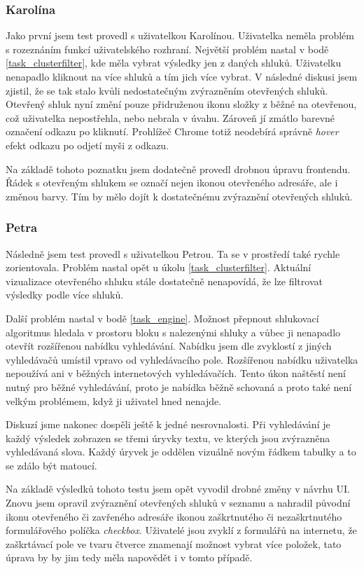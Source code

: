 \subsubsection{Karolína}
Jako první jsem test provedl s uživatelkou Karolínou. Uživatelka neměla problém s rozeznáním funkcí uživatelského rozhraní. Největší problém nastal v bodě \ref{task_clusterfilter}, kde měla vybrat výsledky jen z daných shluků. Uživatelku nenapadlo kliknout na více shluků a tím jich více vybrat. V následné diskusi jsem zjistil, že se tak stalo kvůli nedostatečným zvýrazněním otevřených shluků. Otevřený shluk nyní změní pouze přidruženou ikonu složky z běžné na otevřenou, což uživatelka nepostřehla, nebo nebrala v úvahu. Zároveň jí zmátlo barevné označení odkazu po kliknutí. Prohlížeč Chrome totiž neodebírá správně \emph{hover} efekt odkazu po odjetí myši z odkazu.

Na základě tohoto poznatku jsem dodatečně provedl drobnou úpravu frontendu. Řádek s otevřeným shlukem se označí nejen ikonou otevřeného adresáře, ale i změnou barvy. Tím by mělo dojít k dostatečnému zvýraznění otevřených shluků.

\subsubsection{Petra}
Následně jsem test provedl s uživatelkou Petrou. Ta se v prostředí také rychle zorientovala. Problém nastal opět u úkolu \ref{task_clusterfilter}. Aktuální vizualizace otevřeného shluku stále dostatečně nenapovídá, že lze filtrovat výsledky podle více shluků.

Další problém nastal v bodě \ref{task_engine}. Možnost přepnout shlukovací algoritmus hledala v prostoru bloku s nalezenými shluky a vůbec ji nenapadlo otevřít rozšířenou nabídku vyhledávání. Nabídku jsem dle zvyklostí z jiných vyhledávačů umístil vpravo od vyhledávacího pole. Rozšířenou nabídku uživatelka nepoužívá ani v běžných internetových vyhledávačích. Tento úkon naštěstí není nutný pro běžné vyhledávání, proto je nabídka běžně schovaná a proto také není velkým problémem, když ji uživatel hned nenajde. 

Diskuzí jsme nakonec dospěli ještě k jedné nesrovnalosti. Při vyhledávání je každý výsledek zobrazen se třemi úryvky textu, ve kterých jsou zvýrazněna vyhledávaná slova. Každý úryvek je oddělen vizuálně novým řádkem tabulky a to se zdálo být matoucí.

Na základě výsledků tohoto testu jsem opět vyvodil drobné změny v návrhu UI. Znovu jsem opravil zvýraznění otevřených shluků v seznamu a nahradil původní ikonu otevřeného či zavřeného adresáře ikonou zaškrtnutého či nezaškrtnutého formulářového políčka \emph{checkbox}. Uživatelé jsou zvyklí z formulářů na internetu, že zaškrtávací pole ve tvaru čtverce znamenají možnost vybrat více položek, tato úprava by by jim tedy měla napovědět i v tomto případě.

